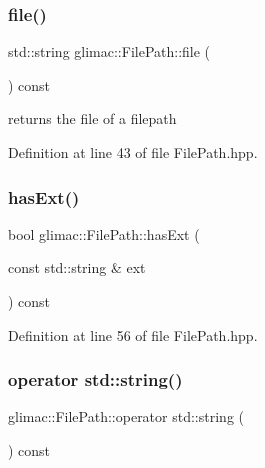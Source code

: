 \mbox{\label{classglimac_1_1_file_path_af62ce630c3e3a5e106556cdf17773f3a}} 
\subsubsection{\texorpdfstring{file()}{file()}}
{\footnotesize\ttfamily std\+::string glimac\+::\+File\+Path\+::file (\begin{DoxyParamCaption}{ }\end{DoxyParamCaption}) const\hspace{0.3cm}{\ttfamily [inline]}}

returns the file of a filepath 

Definition at line 43 of file File\+Path.\+hpp.

\mbox{\label{classglimac_1_1_file_path_a2734fcfcdb943df0c3e8b5b0e8285301}} 
\subsubsection{\texorpdfstring{has\+Ext()}{hasExt()}}
{\footnotesize\ttfamily bool glimac\+::\+File\+Path\+::has\+Ext (\begin{DoxyParamCaption}\item[{const std\+::string \&}]{ext }\end{DoxyParamCaption}) const\hspace{0.3cm}{\ttfamily [inline]}}



Definition at line 56 of file File\+Path.\+hpp.

\mbox{\label{classglimac_1_1_file_path_adef5c3ff1a59b5ce13b51d2cc6370fd9}} 
\subsubsection{\texorpdfstring{operator std\+::string()}{operator std::string()}}
{\footnotesize\ttfamily glimac\+::\+File\+Path\+::operator std\+::string (\begin{DoxyParamCaption}{ }\end{DoxyParamCaption}) const\hspace{0.3cm}{\ttfamily [inline]}}



